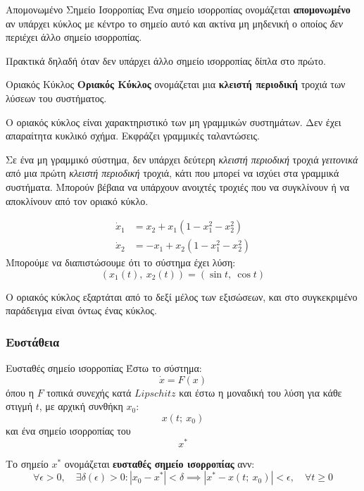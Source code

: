 \documentclass[11pt,a4paper,notitlepage,fleqn,final]{article}
\begin{document}
\begin{defn}{Απομονωμένο Σημείο Ισορροπίας}{}
	Ένα σημείο ισορροπίας ονομάζεται \textbf{απομονωμένο} αν υπάρχει κύκλος
	με κέντρο το σημείο αυτό και ακτίνα μη μηδενική ο οποίος \textit{δεν} περιέχει άλλο
	σημείο ισορροπίας.
	
	Πρακτικά δηλαδή όταν δεν υπάρχει άλλο σημείο ισορροπίας δίπλα στο πρώτο.
\end{defn}

\begin{defn}{Οριακός Κύκλος}{}
	\textbf{Οριακός Κύκλος} ονομάζεται μια \textbf{κλειστή περιοδική} τροχιά των λύσεων του
	συστήματος.
	
	Ο οριακός κύκλος είναι χαρακτηριστικό των μη γραμμικών συστημάτων. Δεν έχει απαραίτητα
	κυκλικό σχήμα. Εκφράζει γραμμικές ταλαντώσεις.
\end{defn}

Σε ένα μη γραμμικό σύστημα, δεν υπάρχει δεύτερη \textit{κλειστή περιοδική} τροχιά
\textit{γειτονικά} από μια πρώτη \textit{κλειστή περιοδική} τροχιά, κάτι που μπορεί να ισχύει
στα γραμμικά συστήματα. Μπορούν βέβαια να υπάρχουν ανοιχτές τροχιές που να συγκλίνουν ή να
αποκλίνουν από τον οριακό κύκλο.

\begin{exercise}[Παράδειγμα]
	\begin{align*}
		\dot x_1 &= x_2 + x_1(1-x_1^2-x_2^2) \\
		\dot x_2 &= -x_1+x_2(1-x_1^2-x_2^2)
	\end{align*}
	\tcblower
	Μπορούμε να διαπιστώσουμε ότι το σύστημα έχει λύση:
	\[
	\left(
	x_1(t),\ x_2(t)
	\right) = \left(
	\sin t,\ \cos t
	\right)
	\]
	
	Ο οριακός κύκλος εξαρτάται από το δεξί μέλος των εξισώσεων, και στο συγκεκριμένο
	παράδειγμα είναι όντως ένας κύκλος.
\end{exercise}

\subsubsection{Ευστάθεια}
\begin{defn}{Ευσταθές σημείο ισορροπίας}{}
	Έστω το σύστημα:
	\[
	\dot x = F(x)
	\]
	όπου η \( F \) τοπικά συνεχής κατά \( Lipschitz \)
	και έστω η μοναδική του λύση για κάθε στιγμή \( t \), με αρχική συνθήκη \( x_0 \):
	\[
	x(t;\ x_0)
	\]
	και ένα σημείο ισορροπίας του
	\[
	x^*
	\]
	
	Το σημείο \( x^* \) ονομάζεται \textbf{ευσταθές σημείο ισορροπίας} ανν:
	\[
	\forall \epsilon > 0,\quad
	\exists \delta(\epsilon) > 0 :
	\left|x_0-x^*\right| < \delta
	\implies \left| x^*-x(t;\ x_0) \right| < \epsilon,\quad \forall t \geq 0
	\]
\end{defn}
\end{document}
